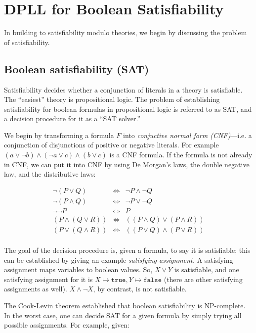 \documentclass[11pt]{article}
\begin{document}
\section{DPLL for Boolean Satisfiability}

In building to satisfiability modulo theories, we begin by discussing the
problem of satisfiability.

\subsection{Boolean satisfiability (SAT)}

Satisfiability decides whether a conjunction of literals in a theory is
satisfiable. The ``easiest'' theory is propositional logic. The problem of
establishing satisfiability for boolean formulas in propositional logic is referred to
as SAT, and a decision procedure for it as a ``SAT solver.''

We begin by transforming a formula $F$ into \emph{conjuctive normal form
  (CNF)}---i.e. a conjunction of disjunctions of positive or negative literals.
For example $(a \lor \lnot b) \land (\lnot a \lor c) \land (b \lor c)$ is a CNF
formula. If the formula is not already in CNF, we can put it into CNF by using
De Morgan's laws, the double negative law, and the distributive laws:

\[
\begin{array}{rcl}
\lnot(P \lor Q) & \iff & \lnot P \land \lnot Q \\
\lnot (P \land Q) & \iff & \lnot P \lor \lnot Q \\
\lnot \lnot P & \iff & P \\
(P \land (Q \lor R)) & \iff & ((P \land Q) \lor (P \land R)) \\
(P \lor (Q \land R)) & \iff & ((P \lor Q) \land (P \lor R)) \\
\end{array}
\]

The goal of the decision procedure is, given a formula, to say it is
satisfiable; this can be established by giving an example \emph{satisfying
  assignment.} A satisfying assignment maps variables to boolean values. So,
$X \lor Y$ is satisfiable, and one satisfying assignment for it is
$X \mapsto \mathtt{true}, Y \mapsto \mathtt{false}$ (there are other satisfying
assignments as well). $X \land \lnot X$, by contrast, is not satisfiable.

The Cook-Levin theorem established that boolean satisfiability is NP-complete.
In the worst case, one can decide SAT for a given formula by simply trying all
possible assignments. For example, given:
\end{document}
